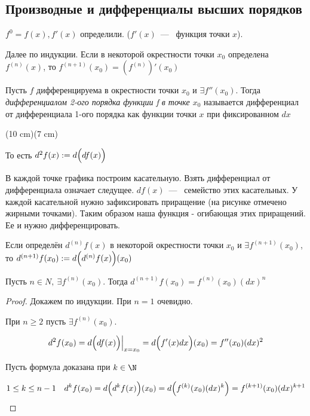 \subsection{Производные и дифференциалы высших порядков}
\begin{definition}
    $f^{0} = f(x), f'(x)$ определили. ($f'(x)$~---~ функция точки $x$).

    Далее по индукции. Если в некоторой окрестности точки $x_{0}$ определена $f^{(n)}(x)$, то $f^{(n+1)} (x_{0}) = \left(f^{(n)}\right)'(x_{0})$
\end{definition}

\begin{definition}
    Пусть $f$ дифференцируема в окрестности точки $x_{0}$ и $\exists f''(x_{0})$. Тогда \textit{дифференциалом 2-ого порядка функции f в точке $x_{0}$} называется дифференциал от дифференциала 1-ого порядка как функции точки $x$ при фиксированном $dx$
\end{definition}

\sidefig(10 cm)(7 cm)
{
\begin{flushleft}
\normalsize
То есть $d^2 f(x) := d\Bigl(df(x)\Bigr)$

В каждой точке графика построим касательную. Взять дифференциал от дифференциала означает следущее. $df(x)$~---~ семейство этих касательных. У каждой касательной нужно зафиксировать приращение (на рисунке отмечено жирными точками). Таким образом наша функция - огибающая этих приращений. Ее и нужно дифференцировать.
\end{flushleft}
}
{

}


    

\begin{definition}
    Если определён $d^{(n)}f(x)$ в некоторой окрестности точки $x_{0}$ и $\exists f^{(n+1)}(x_{0})$, то $d^{(n+1)} f(x_{0}) :=  d\Bigl(d^{(n)}f(x)\Bigr)(x_{0})$
\end{definition}

\begin{theorem}
    Пусть $n\in N, \ \exists f^{(n)}(x_{0})$. Тогда  $d^{(n+1)} f(x_{0}) = f^{(n)}(x_{0}) (dx)^{n}$ 
\end{theorem}
\begin{proof}
    Докажем по индукции. При $n = 1$ очевидно.

    При $n \geq 2$ пусть $\exists f^{(n)}(x_{0})$.

    $$
    d^{2} f(x_{0}) = d\Bigl(df(x)\Bigr) \Bigr|_{x = x_{0}} = d\Bigl(f'(x)dx\Bigr)(x_{0}) = f''(x_{0})(dx)^{2}
    $$

    Пусть формула доказана при $k \in \N$

    $$
    1 \leq k\leq n-1 \quad d^{k} f(x_{0}) = d\Bigl(d^{k} f(x)\Bigr)(x_{0}) = d\Bigl(f^{(k)}(x_{0}) (dx)^{k}\Bigr) = f^{(k +1)}(x_{0})(dx)^{k+1}
    $$
    
\end{proof}